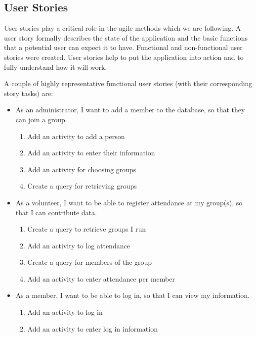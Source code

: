 \documentclass{l3proj}
\begin{document}
\subsection{User Stories}
\label{user_stories}

User stories \cite{UserStories} play a critical role in the agile methods which we are following. A user story formally describes the state of the application and the basic functions that a potential user can expect it to have. Functional and non-functional user stories were created. User stories help to put the application into action and to fully understand how it will work.

A couple of highly representative functional user stories (with their corresponding story tasks) are:
\begin{itemize}
\item As an administrator, I want to add a member to the database, so that they can join a group.

	\begin{enumerate}
	\item Add an activity to add a person
	\item Add an activity to enter their information
	\item Add an activity for choosing groups
	\item Create a query for retrieving groups
	\end{enumerate}

\item As a volunteer, I want to be able to register attendance at my group(s), so that I can contribute data.

	\begin{enumerate}
	\item Create a query to retrieve groups I run
	\item Add an activity to log attendance
	\item Create a query for members of the group
	\item Add an activity to enter attendance per member
	\end{enumerate}

\item As a member, I want to be able to log in, so that I can view my information.

	\begin{enumerate}
	\item Add an activity to log in
	\item Add an activity to enter log in information
	\end{enumerate}
\end{itemize}
\end{document}
